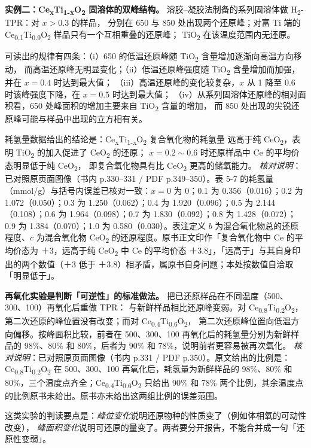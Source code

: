 \begin{dataflow}
\textbf{实例二：Ce\textsubscript{x}Ti\textsubscript{1-x}O\textsubscript{2} 固溶体的双峰结构。}
溶胶--凝胶法制备的系列固溶体做 H\textsubscript{2}-TPR：对 $x>0.3$ 的样品，
分别在 \qty{650}{\degC} 与 \qty{850}{\degC} 处出现两个还原峰；对富 Ti 端的
Ce\textsubscript{0.1}Ti\textsubscript{0.9}O\textsubscript{2} 样品只有一个互相重叠的还原峰；
TiO\textsubscript{2} 在该温度范围内无还原。

可读出的规律有四条：（i）\qty{650}{\degC} 的低温还原峰随 TiO\textsubscript{2} 含量增加逐渐向高温方向移动，
而高温还原峰无明显变化；（ii）低温还原峰强度随 TiO\textsubscript{2} 含量增加而加强，并在 $x=0.4$ 时达到最大值；
（iii）高温还原峰的变化较复杂，$x$ 从 1 降至 0.6 时该峰强度下降，在 $x=0.5$ 时达到最大值；
（iv）从系列固溶体还原峰的相对面积看，\qty{650}{\degC} 处峰面积的增加主要来自 TiO\textsubscript{2} 含量的增加，
而 \qty{850}{\degC} 处出现的尖锐还原峰可能与样品中出现的立方相有关。

耗氢量数据给出的结论是：Ce\textsubscript{x}Ti\textsubscript{1-x}O\textsubscript{2} 复合氧化物的耗氢量
远高于纯 CeO\textsubscript{2}，表明 TiO\textsubscript{2} 的加入促进了 CeO\textsubscript{2} 的还原；
$x=0.2\sim0.6$ 时还原样品中 Ce 的平均价态明显低于纯 CeO\textsubscript{2}，
即复合氧化物具有比 CeO\textsubscript{2} 更高的储氧能力。
\emph{核对说明}：已对照原页面图像（书内 p.330--331 / PDF p.349--350）。表 5-7 的耗氢量（mmol/g）与括号内误差已核对一致：$x=0$ 为 0；0.1 为 0.356（0.016）；0.2 为 1.072（0.050）；0.3 为 1.250（0.062）；0.4 为 1.920（0.096）；0.5 为 2.144（0.108）；0.6 为 1.964（0.098）；0.7 为 1.830（0.092）；0.8 为 1.428（0.072）；0.9 为 1.384（0.070）；1.0 为 0.580（0.030）。表注定义 $b$ 为混合氧化物总的还原程度、$c$ 为混合氧化物 CeO\textsubscript{2} 的还原程度。原书正文印作「复合氧化物中 Ce 的平均价态为 ＋3，远高于纯 CeO\textsubscript{2} 中 Ce 的平均价态 ＋3.8」，「远高于」与其自身印出的两个数值（＋3 低于 ＋3.8）相矛盾，属原书自身问题；本处按数值自洽取「明显低于」。
\end{dataflow}

\begin{measure}
\textbf{再氧化实验是判断「可逆性」的标准做法。}
把已还原样品在不同温度（\qty{500}{\degC}、\qty{300}{\degC}、\qty{100}{\degC}）再氧化后重做 TPR：
与新鲜样品相比还原峰变弱。对 Ce\textsubscript{0.8}Ti\textsubscript{0.2}O\textsubscript{2}，
第二次还原的峰位置没有改变；而对 Ce\textsubscript{0.4}Ti\textsubscript{0.6}O\textsubscript{2}，
第二次还原峰位置向低温方向偏移。按峰面积比较，前者在 \qty{500}{\degC}、\qty{300}{\degC}、\qty{100}{\degC}
再氧化后的耗氢量分别为新鲜样品的 98\%、80\% 和 80\%，后者为 90\% 和 78\%，说明前者更容易被再次氧化。
\emph{核对说明}：已对照原页面图像（书内 p.331 / PDF p.350）。原文给出的比例是：Ce\textsubscript{0.8}Ti\textsubscript{0.2}O\textsubscript{2} 在 \qty{500}{\degC}、\qty{300}{\degC}、\qty{100}{\degC} 再氧化后，耗氢量为新鲜样品的 98\%、80\% 和 80\%，三个温度点齐全；Ce\textsubscript{0.4}Ti\textsubscript{0.6}O\textsubscript{2} 只给出 90\% 和 78\% 两个比例，其余温度点的比例原书未给出。原书亦未给出这两组比例的误差范围。

这类实验的判读要点是：\emph{峰位变化}说明还原物种的性质变了（例如体相氧的可动性改变），
\emph{峰面积变化}说明可还原的量变了。两者要分开报告，不能合并成一句「还原性变弱」。
\end{measure}

